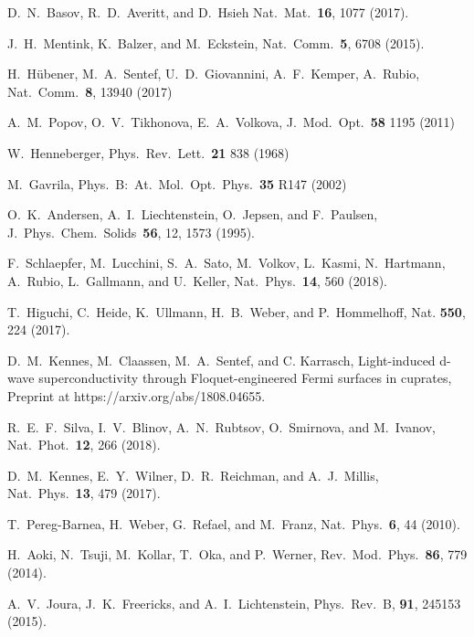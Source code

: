 \documentclass[prb,aps,twocolumn,showpacs,amsmath,amssymb]{revtex4}%
\begin{document}
\begin{thebibliography}{99}

D.\ N.\ Basov, R.\ D.\ Averitt, and D.\ Hsieh 
Nat.\ Mat.\ {\bf 16}, 1077 (2017).

J.\ H.\ Mentink, K.\ Balzer, and M.\ Eckstein,
Nat.\ Comm.\ {\bf 5}, 6708 (2015).


 
H.\ H\"ubener, M.\ A.\ Sentef, U.\ D.\ Giovannini, A.\ F.\ Kemper, A.\ Rubio,
Nat.\ Comm.\ {\bf 8}, 13940 (2017)

A.\ M.\ Popov, O.\ V.\ Tikhonova, E.\ A.\  Volkova,
J.\ Mod.\ Opt.\ {\bf 58} 1195 (2011) 

W.\ Henneberger,
Phys.\ Rev.\ Lett.\ {\bf 21} 838 (1968)

M.\ Gavrila,
Phys.\ B:\ At.\ Mol.\ Opt.\ Phys.\ {\bf 35} R147 (2002)


O.\ K.\ Andersen, A.\ I.\ Liechtenstein, O.\ Jepsen, and F.\ Paulsen,
J.\ Phys.\ Chem.\ Solids\ {\bf 56}, 12, 1573 (1995).

F.\ Schlaepfer, M.\ Lucchini, S.\ A.\ Sato, M.\ Volkov, L.\ Kasmi, N.\ Hartmann, A.\ Rubio, L.\ Gallmann, and U.\ Keller, 
Nat.\ Phys.\ {\bf 14}, 560 (2018).

T.\ Higuchi, C.\ Heide, K.\ Ullmann, H.\ B.\ Weber, and P.\ Hommelhoff,
Nat. {\bf 550}, 224 (2017).

D.\ M.\ Kennes, M.\ Claassen, M.\ A.\ Sentef, and C. Karrasch,
Light-induced d-wave superconductivity through Floquet-engineered Fermi surfaces in cuprates,
Preprint at https://arxiv.org/abs/1808.04655.

R.\ E.\ F.\ Silva, I.\ V.\ Blinov, A.\ N.\ Rubtsov, O.\ Smirnova, and M.\ Ivanov,
Nat.\ Phot.\ {\bf 12}, 266 (2018).

D.\ M.\ Kennes, E.\ Y.\  Wilner, D.\ R.\ Reichman, and A.\ J.\  Millis,
Nat.\ Phys.\ {\bf 13}, 479 (2017).

T.\ Pereg-Barnea, H.\ Weber, G.\ Refael, and M.\ Franz,
Nat.\ Phys.\ {\bf 6}, 44 (2010).

H.\ Aoki, N.\ Tsuji, M.\ Kollar, T.\ Oka, and P.\ Werner,
 Rev.\ Mod.\ Phys.\ {\bf 86}, 779 (2014).

A.\  V.\ Joura, J.\ K.\ Freericks, and A.\ I.\ Lichtenstein,
    Phys.\ Rev.\ B, {\bf 91}, 245153 (2015).


\end{thebibliography}
\end{document}
